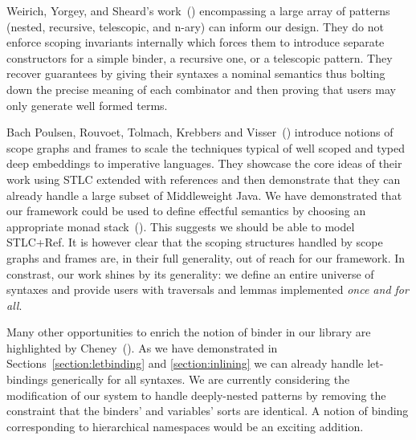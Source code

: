 Weirich, Yorgey, and Sheard's work~(\citeyear{DBLP:conf/icfp/WeirichYS11})
encompassing a large array of patterns (nested, recursive, telescopic, and
n-ary) can inform our design. They do not enforce scoping invariants internally
which forces them to introduce separate constructors for a simple binder, a
recursive one, or a telescopic pattern. They recover guarantees by giving
their syntaxes a nominal semantics thus bolting down the precise meaning of
each combinator and then proving that users may only generate well formed
terms.

Bach Poulsen, Rouvoet, Tolmach, Krebbers and Visser~(\citeyear{BachPoulsen})
introduce notions of scope graphs and frames to scale the techniques typical
of well scoped and typed deep embeddings to imperative languages.
They showcase the core ideas of their work using STLC extended with references
and then demonstrate that they can already handle a large subset of Middleweight
Java.
%
We have demonstrated that our framework could be used to define effectful
semantics by choosing an appropriate monad
stack~(\cite{DBLP:journals/iandc/Moggi91}).
This suggests we should be able to model STLC+Ref. It is however clear that
the scoping structures handled by scope graphs and frames are, in their full
generality, out of reach for our framework. In constrast, our work shines by
its generality: we define an entire universe of syntaxes and provide users
with traversals and lemmas implemented \emph{once and for all}.

Many other opportunities to enrich the notion of binder in our library are
highlighted by Cheney~(\citeyear{DBLP:conf/icfp/Cheney05a}).%
As we have demonstrated
in Sections~\ref{section:letbinding} and \ref{section:inlining} we can already
handle let-bindings generically for all syntaxes. We are currently considering
the modification of our system to handle deeply-nested patterns by removing the
constraint that the binders' and variables' sorts are identical. A notion of
binding corresponding to hierarchical namespaces would be an exciting addition.


